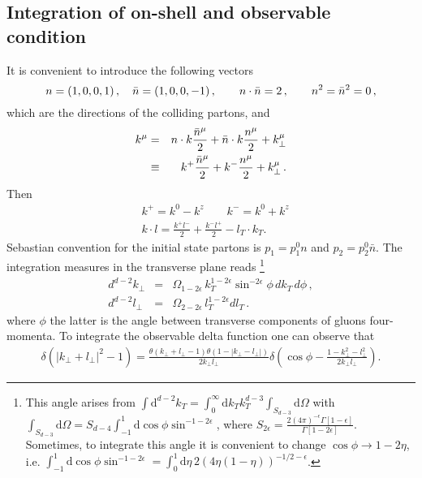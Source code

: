 \documentclass[a4paper,11pt]{article}
\numberwithin{equation}{section}
\newcommand{\dd}{\text{d}}
\newcommand{\eps}{\epsilon}
\begin{document}
\subsection{Integration of on-shell and observable condition}

It is convenient to introduce the following vectors
%
\begin{equation}
  n = (1,0,0,1)\,,\quad \bar{n} = (1,0,0,-1)\,, \qquad n\cdot \bar{n} = 2\,,
  \qquad n^2 = \bar{n}^2 = 0\,,
  \label{eq:nnbar-defs}
\end{equation}
%
which are the directions of the colliding partons, and
%
\begin{eqnarray}
  k^\mu 
  & =  &
  n\cdot k \frac{\bar{n}^\mu}{2} + \bar{n} \cdot k \frac{n^\mu}{2} + 
  k_\perp^\mu \\
  & \equiv & 
  k^+ \frac{\bar{n}^\mu}{2} +  k^- \frac{n^\mu}{2} + k_\perp^\mu\,.
\end{eqnarray}
Then
\begin{align}
&k^+=k^0-k^z\qquad k^-=k^0+k^z \\
&k\cdot l= \frac{k^+ l^-}{2}+\frac{k^- l^+}{2}- l_T\cdot k_T.
\end{align}
Sebastian convention for the initial state partons is $p_1=p_1^0 n$ and $p_2=p_2^0 \bar{n}$. 
The integration measures in the transverse plane reads 
\footnote{This angle arises from  
$\int \dd^{d-2} k_T=\int_0^\infty \dd k_T k_T^{d-3} \int_{S_{d-3}}\dd \Omega  $ with
$\int_{S_{d-3}} \dd \Omega= S_{d-4}\int_{-1}^{1}\dd \cos\phi \sin^{-1-2 \eps}$, where $S_{2\eps}= \frac{2(4\pi)^{-\eps} \Gamma[1-\eps]}{\Gamma[1-2\eps]}$. Sometimes, to integrate this angle it is convenient
to change $\cos\phi \to 1-2\eta$, i.e. 
$\int_{-1}^{1}\dd \cos\phi \sin^{-1-2 \eps}
=\int_{0}^{1}\dd \eta\, 2(4\eta(1-\eta))^{-1/2- \eps} $.}
%
\begin{eqnarray}
  d^{d-2} k_\perp & = & 
  \Omega_{1-2\epsilon}\,
  k_T^{1-2\epsilon} \sin^{-2\epsilon}\! \phi\, d k_T\, d\phi\,,
  \\
  d^{d-2} l_\perp & = & 
  \Omega_{2-2\epsilon}\,
  l_T^{1-2\epsilon} d l_T\,.
\end{eqnarray}
where $\phi$ the latter is the angle between transverse components of gluons four-momenta. 
%
To integrate the observable delta function one can observe that
%
\begin{align}
 \delta\left(|k_\perp+l_\perp|^2-1\right)=
\frac{\theta(k_\perp+l_\perp-1) \theta(1-|k_\perp-l_\perp|)}
{2k_\perp l_\perp} \delta\left(\cos\phi -\frac{1- k_\perp^2-l_\perp^2}{2k_\perp l_\perp }\right).
\end{align}
\end{document}
